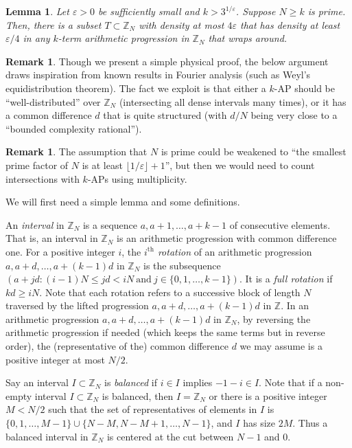 \documentclass[11pt]{article}
\numberwithin{equation}{section}
\newtheorem{lem}[result]{Lemma}
\theoremstyle{definition}
\newtheorem{rmk}[result]{Remark}
\theoremstyle{remark}
\begin{document}
\begin{lem}\label{intervaltocyclic} Let $\varepsilon>0$ be sufficiently small and $k>3^{1/\varepsilon}$. Suppose $N \geq k$ is prime. Then, there is a subset $T \subset \mathbb{Z}_N$ with density at most $4\varepsilon$ that has density at least $\varepsilon/4$ in any $k$-term arithmetic progression in $\mathbb{Z}_N$ that wraps around. 
\end{lem}
\begin{rmk}
    Though we present a simple physical proof, the below argument draws inspiration from known results in Fourier analysis (such as Weyl's equidistribution theorem). The fact we exploit is that either a $k$-AP should be ``well-distributed'' over $\mathbb{Z}_N$ (intersecting all dense intervals many times), or it has a common difference $d$ that is quite structured (with $d/N$ being very close to a ``bounded complexity rational'').
    \end{rmk}

\begin{rmk}
The assumption that $N$ is prime could be weakened to ``the smallest prime factor of $N$ is at least $\lfloor 1/\varepsilon\rfloor+1$'', but then we would need to count intersections with $k$-APs using multiplicity.
\end{rmk}

We will first need a simple lemma and some definitions. 

An {\it interval} in $\mathbb{Z}_N$ is a sequence $a,a+1,\ldots,a+k-1$ of consecutive elements. That is, an interval in $\mathbb{Z}_N$ is an arithmetic progression with common difference one. For a positive integer $i$, the {\it $i^{\textrm{th}}$ rotation} of an arithmetic progression $a,a+d,\ldots,a+(k-1)d$ in $\mathbb{Z}_N$ is the subsequence $(a+jd: (i-1)N \leq jd < iN~\textrm{and}~j \in \{0,1,\ldots,k-1\})$. It is a {\it full rotation} if $kd \geq iN$. Note that each rotation refers to a successive block of length $N$ traversed by the lifted progression $a,a+d,\ldots,a+(k-1)d$ in $\mathbb{Z}$. In an arithmetic progression $a,a+d,\ldots,a+(k-1)d$ in $\mathbb{Z}_N$, by  reversing the arithmetic progression if needed (which keeps the same terms but in reverse order), the (representative of the) common difference $d$ we may assume is a positive integer at most $N/2$. 

Say an interval $I\subset\mathbb{Z}_N$ is \textit{balanced} if $i\in I$ implies $-1-i\in I$. Note that if a non-empty interval $I \subset \mathbb{Z}_N$ is balanced, then $I=\mathbb{Z}_N$ or there is a positive integer $M<N/2$ such that the set of representatives of elements in $I$ is $\{0,1,\ldots,M-1\} \cup \{N-M,N-M+1,\ldots,N-1\}$, and $I$ has size $2M$. Thus a balanced interval in $\mathbb{Z}_N$ is centered at the cut between $N-1$ and $0$. 
\end{document}
